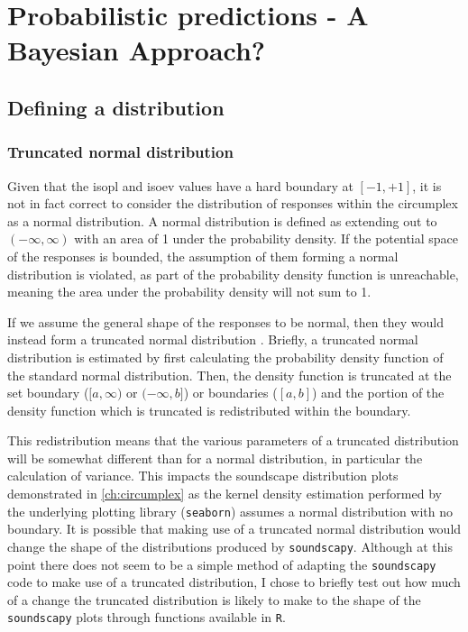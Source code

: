 \section{Probabilistic predictions - A Bayesian Approach?}

\subsection{Defining a distribution}

\subsubsection{Truncated normal distribution}

Given that the \gls{isopl} and \gls{isoev} values have a hard boundary at $[-1, +1]$, it is not in fact correct to consider the distribution of responses within the circumplex as a normal distribution. A normal distribution is defined as extending out to $(-\infty, \infty)$ with an area of 1 under the probability density. If the potential space of the responses is bounded, the assumption of them forming a normal distribution is violated, as part of the probability density function is unreachable, meaning the area under the probability density will not sum to 1.

If we assume the general shape of the responses to be normal, then they would instead form a truncated normal distribution . Briefly, a truncated normal distribution is estimated by first calculating the probability density function of the standard normal distribution. Then, the density function is truncated at the set boundary ($[a, \infty)$ or $(-\infty, b]$) or boundaries ($[a, b]$) and the portion of the density function which is truncated is redistributed within the boundary.

This redistribution means that the various parameters of a truncated distribution will be somewhat different than for a normal distribution, in particular the calculation of variance. This impacts the soundscape distribution plots demonstrated in \cref{ch:circumplex} as the kernel density estimation performed by the underlying plotting library (\texttt{seaborn}) assumes a normal distribution with no boundary. It is possible that making use of a truncated normal distribution would change the shape of the distributions produced by \texttt{soundscapy}. Although at this point there does not seem to be a simple method of adapting the \texttt{soundscapy} code to make use of a truncated distribution, I chose to briefly test out how much of a change the truncated distribution is likely to make to the shape of the \texttt{soundscapy} plots through functions available in \texttt{R}.

